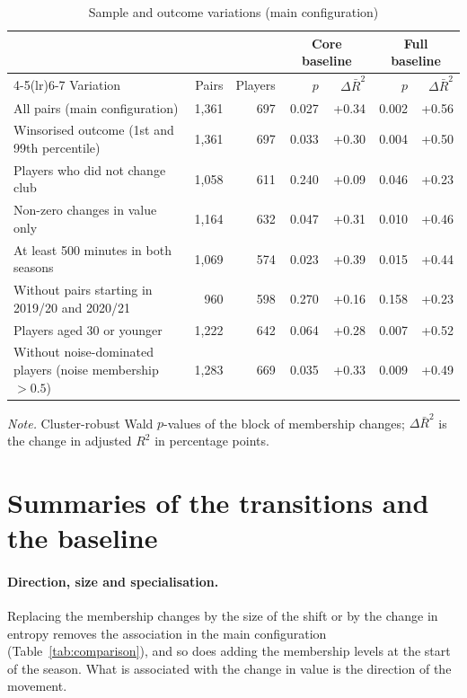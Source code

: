 \begin{table}[ht]
	\centering
	\small
	\caption{Sample and outcome variations (main configuration)}
	\label{tab:variations}
	\begin{tabular}{lrrrrrr}
		\toprule
		 & & & \multicolumn{2}{c}{Core baseline} & \multicolumn{2}{c}{Full baseline} \\
		\cmidrule(lr){4-5}\cmidrule(lr){6-7}
		Variation & Pairs & Players & $p$ & $\Delta\bar R^2$ & $p$ & $\Delta\bar R^2$ \\
		\midrule
All pairs (main configuration) & 1,361 & 697 & 0.027 & +0.34 & 0.002 & +0.56 \\
Winsorised outcome (1st and 99th percentile) & 1,361 & 697 & 0.033 & +0.30 & 0.004 & +0.50 \\
Players who did not change club & 1,058 & 611 & 0.240 & +0.09 & 0.046 & +0.23 \\
Non-zero changes in value only & 1,164 & 632 & 0.047 & +0.31 & 0.010 & +0.46 \\
At least 500 minutes in both seasons & 1,069 & 574 & 0.023 & +0.39 & 0.015 & +0.44 \\
Without pairs starting in 2019/20 and 2020/21 & 960 & 598 & 0.270 & +0.16 & 0.158 & +0.23 \\
Players aged 30 or younger & 1,222 & 642 & 0.064 & +0.28 & 0.007 & +0.52 \\
Without noise-dominated players (noise membership $>0.5$) & 1,283 & 669 & 0.035 & +0.33 & 0.009 & +0.49 \\
		\bottomrule
	\end{tabular}
	\par\smallskip
	\parbox{0.95\textwidth}{\footnotesize\emph{Note.} Cluster-robust Wald $p$-values of the block of membership changes; $\Delta\bar R^2$ is the change in adjusted $R^2$ in percentage points.}
\end{table}

\section{Summaries of the transitions and the baseline}
\label{sec:rob-baseline}

\paragraph{Direction, size and specialisation.} Replacing the membership changes by the size of the shift or by the change in entropy removes the association in the main configuration (Table~\ref{tab:comparison}), and so does adding the membership levels at the start of the season. What is associated with the change in value is the direction of the movement.

